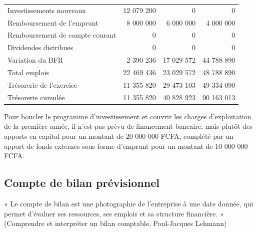 \begin{xltabular}{\textwidth}{@{} X r r r @{}}
Investissements nouveaux & 12 079 200 & 0 & 0 \\
Remboursement de l'emprunt & 8 000 000 & 6 000 000 & 4 000 000 \\
Remboursement de compte courant & 0 & 0 & 0 \\
Dividendes distribues & 0 & 0 & 0 \\
Variation du BFR & 2 390 236 & 17 029 572 & 44 788 890 \\
\midrule
Total emplois & 22 469 436 & 23 029 572 & 48 788 890 \\
\midrule
Trésorerie de l'exercice & 11 355 820 & 29 473 103 & 49 334 090 \\
Trésorerie cumulée & 11 355 820 & 40 828 923 & 90 163 013 \\
\end{xltabular}

Pour boucler le programme d'investissement et couvrir les charges d'exploitation de la première année, il n'est pas prévu de financement bancaire, mais plutôt des apports en capital pour un montant de 20 000 000 FCFA, complété par un apport de fonds externes sous forme d’emprunt pour un montant de 10 000 000 FCFA. 

\subsection{Compte de bilan prévisionnel}
« Le compte de bilan est une photographie de l'entreprise à une date donnée, qui permet d'évaluer ses ressources, ses emplois et sa structure financière. » (Comprendre et interpréter un bilan comptable, Paul-Jacques Lehmann)

